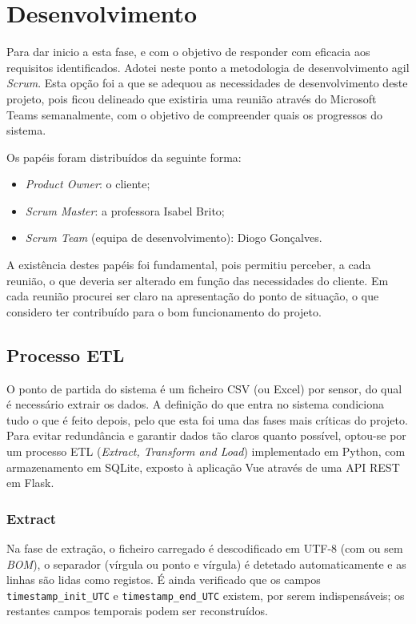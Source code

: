 \chapter{Desenvolvimento}
\label{cap4}


Para dar inicio a esta fase, e com o objetivo de responder com eficacia aos requisitos identificados. Adotei neste ponto a metodologia de desenvolvimento agil \textit{Scrum}. Esta opção foi a que se adequou as necessidades de desenvolvimento deste projeto, pois ficou delineado que existiria uma reunião através do Microsoft Teams semanalmente, com o objetivo de compreender quais os progressos do sistema. 

Os papéis foram distribuídos da seguinte forma:
 
\begin{itemize}
  \item \textit{Product Owner}: o cliente;
  \item \textit{Scrum Master}: a professora Isabel Brito;
  \item \textit{Scrum Team} (equipa de desenvolvimento): Diogo Gonçalves.
\end{itemize}

A existência destes papéis foi fundamental, pois permitiu perceber, a cada reunião, o que deveria ser alterado em função das necessidades do cliente. Em cada reunião procurei ser claro na apresentação do ponto de situação, o que considero ter contribuído para o bom funcionamento do projeto.


\section{Processo ETL}
\label{sec:etl}

O ponto de partida do sistema é um ficheiro CSV (ou Excel) por sensor, do qual é necessário extrair os dados. A definição do que entra no sistema condiciona tudo o que é feito depois, pelo que esta foi uma das fases mais críticas do projeto. Para evitar redundância e garantir dados tão claros quanto possível, optou-se por um processo ETL (\textit{Extract, Transform and Load}) implementado em Python, com armazenamento em SQLite, exposto à aplicação Vue através de uma API REST em Flask.
 
\subsection{Extract}
\label{sec:etl-extract}

Na fase de extração, o ficheiro carregado é descodificado em UTF-8 (com ou sem \textit{BOM}), o separador (vírgula ou ponto e vírgula) é detetado automaticamente e as linhas são lidas como registos. É ainda verificado que os campos \texttt{timestamp\_init\_UTC} e \texttt{timestamp\_end\_UTC} existem, por serem indispensáveis; os restantes campos temporais podem ser reconstruídos.

